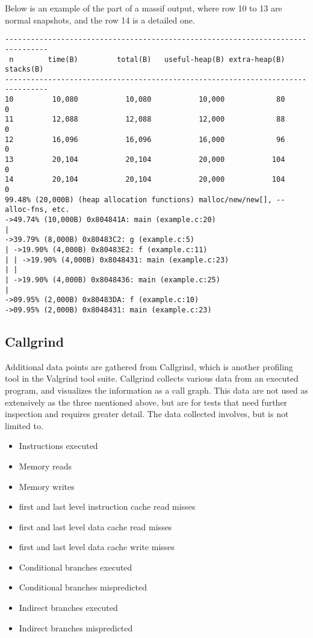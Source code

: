 Below is an example of the part of a massif output, where row 10 to 13 are normal snapshots, and the row 14 is a detailed one.

\begin{lstlisting}[basicstyle=\footnotesize, caption={Massif output example (massif documentation\protect\cite{massif_manual})}, label=lst:massif_output]
--------------------------------------------------------------------------------
 n        time(B)         total(B)   useful-heap(B) extra-heap(B)    stacks(B)
--------------------------------------------------------------------------------
10         10,080           10,080           10,000            80            0
11         12,088           12,088           12,000            88            0
12         16,096           16,096           16,000            96            0
13         20,104           20,104           20,000           104            0
14         20,104           20,104           20,000           104            0
99.48% (20,000B) (heap allocation functions) malloc/new/new[], --alloc-fns, etc.
->49.74% (10,000B) 0x804841A: main (example.c:20)
|
->39.79% (8,000B) 0x80483C2: g (example.c:5)
| ->19.90% (4,000B) 0x80483E2: f (example.c:11)
| | ->19.90% (4,000B) 0x8048431: main (example.c:23)
| |
| ->19.90% (4,000B) 0x8048436: main (example.c:25)
|
->09.95% (2,000B) 0x80483DA: f (example.c:10)
->09.95% (2,000B) 0x8048431: main (example.c:23)
\end{lstlisting}

\subsection{Callgrind}
\label{subsec:measurements_callgrind}
Additional data points are gathered from Callgrind\cite{callgrind_manual}, which is another profiling tool in the Valgrind tool suite.
Callgrind collects various data from an executed program, and visualizes the information as a call graph.
This data are not used as extensively as the three mentioned above,
but are for tests that need further inspection and requires greater detail.
The data collected involves, but is not limited to.

\begin{itemize}
    \item Instructions executed
    \item Memory reads
    \item Memory writes
    \item first and last level instruction cache read misses
    \item first and last level data cache read misses
    \item first and last level data cache write misses
    \item Conditional branches executed
    \item Conditional branches mispredicted
    \item Indirect branches executed
    \item Indirect branches mispredicted
\end{itemize}

